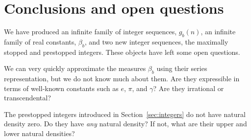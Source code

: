 \documentclass[12pt]{amsart}
\theoremstyle{definition}
\begin{document}
\section{Conclusions and open questions}%
\label{sec:conclusion}

We have produced an infinite family of integer sequences, $g_b(n)$, an infinite
family of real constants, $\beta_b$, and two new integer sequences, the
maximally stopped and prestopped integers. These objects have left some open
questions.

We can very quickly approximate the measures $\beta_b$ using their series
representation, but we do not know much about them. Are they expressible in
terms of well-known constants such as $e$, $\pi$, and $\gamma$? Are they
irrational or transcendental?

The prestopped integers introduced in Section~\ref{sec:integers} do not have
natural density zero. Do they have \emph{any} natural density? If not, what are
their upper and lower natural densities?



\end{document}
